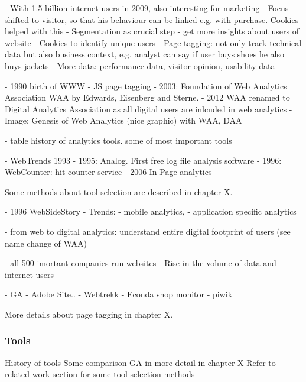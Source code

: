 

- With 1.5 billion internet users in 2009, also interesting for marketing
- Focus shifted to visitor, so that his behaviour can be linked e.g. with purchase.  Cookies helped with this
- Segmentation as crucial step
- get more insights about users of website
- Cookies to identify unique users
- Page tagging: not only track technical data but also business context, e.g. analyst can say if user buys shoes he also buys jackets
- More data: performance data, visitor opinion, usability data


- 1990 birth of WWW
- JS page tagging
- 2003: Foundation of Web Analytics Association WAA by Edwards, Eisenberg and Sterne.
- 2012 WAA renamed to Digital Analytics Association as all digital users are inlcuded in web analytics
- Image: Genesis of Web Analytics (nice graphic) with WAA, DAA

- table history of analytics tools. some of most important tools

- WebTrends 1993
- 1995: Analog. First free log file analysis software
- 1996: WebCounter: hit counter service
- 2006 In-Page analytics


Some methods about tool selection are described in chapter X.


- 1996 WebSideStory
- Trends:
- mobile analytics,
- application specific analytics

- from web to digital analytics: understand entire digital footprint of users (see name change of WAA)

- all 500 imortant companies run websites
- Rise in the volume of data and internet users

- GA
- Adobe Site..
- Webtrekk
- Econda shop monitor
- piwik




More details about page tagging in chapter X.






\subsubsection{Tools}


History of tools
Some comparison
GA in more detail in chapter X
Refer to related work section for some tool selection methods



